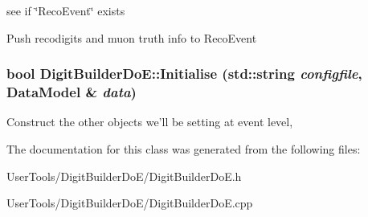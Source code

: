 see if \char`\"{}RecoEvent\char`\"{} exists

Push recodigits and muon truth info to RecoEvent \hypertarget{classDigitBuilderDoE_a629487cb173c306f7796d4466049d790}{
\subsubsection[{Initialise}]{\setlength{\rightskip}{0pt plus 5cm}bool DigitBuilderDoE::Initialise (std::string {\em configfile}, \/  {\bf DataModel} \& {\em data})}}
\label{classDigitBuilderDoE_a629487cb173c306f7796d4466049d790}


Construct the other objects we'll be setting at event level, 

The documentation for this class was generated from the following files:\begin{DoxyCompactItemize}
\item 
UserTools/DigitBuilderDoE/DigitBuilderDoE.h\item 
UserTools/DigitBuilderDoE/DigitBuilderDoE.cpp\end{DoxyCompactItemize}

